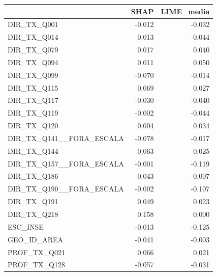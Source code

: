 \begin{tabular}{lrr}
\toprule
 & SHAP & LIME\_media \\
\midrule
DIR\_TX\_Q001 & -0.012 & -0.032 \\
DIR\_TX\_Q014 & 0.013 & -0.044 \\
DIR\_TX\_Q079 & 0.017 & 0.040 \\
DIR\_TX\_Q094 & 0.011 & 0.050 \\
DIR\_TX\_Q099 & -0.070 & -0.014 \\
DIR\_TX\_Q115 & 0.069 & 0.027 \\
DIR\_TX\_Q117 & -0.030 & -0.040 \\
DIR\_TX\_Q119 & -0.002 & -0.044 \\
DIR\_TX\_Q120 & 0.004 & 0.034 \\
DIR\_TX\_Q141\_\_FORA\_ESCALA & -0.078 & -0.017 \\
DIR\_TX\_Q144 & 0.063 & 0.025 \\
DIR\_TX\_Q157\_\_FORA\_ESCALA & -0.001 & -0.119 \\
DIR\_TX\_Q186 & -0.043 & -0.007 \\
DIR\_TX\_Q190\_\_FORA\_ESCALA & -0.002 & -0.107 \\
DIR\_TX\_Q191 & 0.049 & 0.023 \\
DIR\_TX\_Q218 & 0.158 & 0.000 \\
ESC\_INSE & -0.013 & -0.125 \\
GEO\_ID\_AREA & -0.041 & -0.003 \\
PROF\_TX\_Q021 & 0.066 & 0.021 \\
PROF\_TX\_Q128 & -0.057 & -0.031 \\
\bottomrule
\end{tabular}

